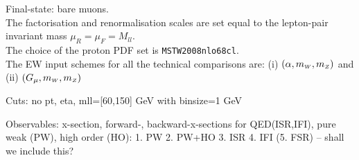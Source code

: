 \noindent
Final-state: bare muons.\\
The factorisation and renormalisation scales are set equal to the lepton-pair
invariant mass $\mu_R=\mu_F=M_{ll}$.\\
The choice of the proton PDF set is {\tt MSTW2008nlo68cl}.\\
The EW input schemes for all the technical comparisons are:
(i) $(\alpha,m_{\scriptscriptstyle W},m_{\scriptscriptstyle Z})$ and (ii) $(G_\mu,m_{\scriptscriptstyle W},m_{\scriptscriptstyle Z})$



Cuts: no pt, eta, mll=[60,150] GeV with binsize=1 GeV

Observables: x-section, forward-, backward-x-sections for
QED(ISR,IFI), pure weak (PW), high order (HO):
1. PW
2. PW+HO
3. ISR
4. IFI
(5. FSR) -- shall we include this?








